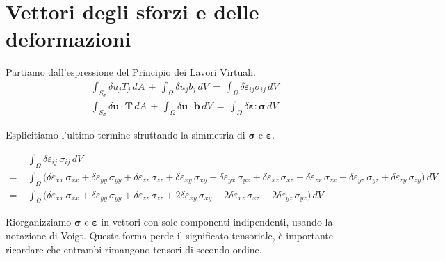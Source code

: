 \section{Vettori degli sforzi e delle deformazioni}

Partiamo dall'espressione del Principio dei Lavori Virtuali.
\begin{align*}
     & \int_{S_{\sigma}}  \delta u_j T_j \, dA  \, +\,\int_{\Omega} \delta u_{j}  b_j  \, dV \, = \, \int_{\Omega} \delta \varepsilon_{ij}  \sigma_{ij}  \, dV   \\
    &  \int_{S_{\sigma}} \delta \mathbf{u} \cdot \mathbf{T} \, dA 
    \,+\, \int_{\Omega} \delta \mathbf{u} \cdot \mathbf{b} \, dV 
    \,=\, \int_{\Omega} \delta \boldsymbol{\varepsilon} : \boldsymbol{\sigma} \, dV
\end{align*}


Esplicitiamo l'ultimo termine sfruttando la simmetria di $\boldsymbol{\sigma}$ e $\boldsymbol{\varepsilon}$.

\begin{align*}
     & \int_{\Omega} \delta \varepsilon_{ij} \, \sigma_{ij} \, dV \\
  =\; & \int_{\Omega} \big( \delta \varepsilon_{xx} \, \sigma_{xx}
     + \delta \varepsilon_{yy} \, \sigma_{yy}
     + \delta \varepsilon_{zz} \, \sigma_{zz}
     + \delta \varepsilon_{xy} \, \sigma_{xy}
     + \delta \varepsilon_{yx} \, \sigma_{yx}
     + \delta \varepsilon_{xz} \, \sigma_{xz}
     + \delta \varepsilon_{zx} \, \sigma_{zx}
     + \delta \varepsilon_{yz} \, \sigma_{yz}
     + \delta \varepsilon_{zy} \, \sigma_{zy} \big) \, dV \\
  =\; & \int_{\Omega} \big( \delta \varepsilon_{xx} \, \sigma_{xx}
     + \delta \varepsilon_{yy} \, \sigma_{yy}
     + \delta \varepsilon_{zz} \, \sigma_{zz}
     + 2 \delta \varepsilon_{xy} \, \sigma_{xy}
     + 2 \delta \varepsilon_{xz} \, \sigma_{xz}
     + 2 \delta \varepsilon_{yz} \, \sigma_{yz} \big) \, dV
\end{align*}


Riorganizziamo  $\boldsymbol{\sigma}$ e $\boldsymbol{\varepsilon}$ in vettori con sole componenti indipendenti, usando la notazione di Voigt. Questa forma perde il significato tensoriale, è importante ricordare che entrambi rimangono tensori di secondo ordine.

